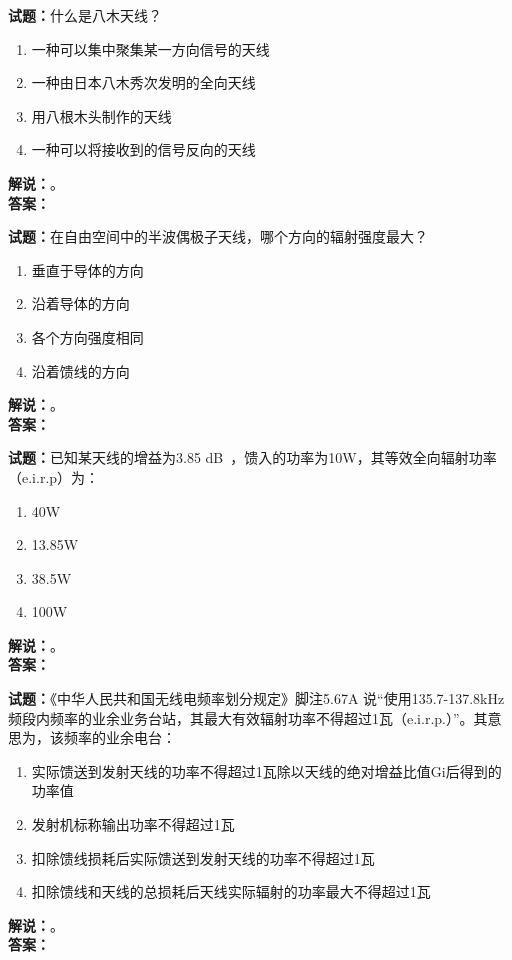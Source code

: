 \documentclass{ctexbook}
\begin{document}
\bigskip

\noindent\textbf{试题：}什么是八木天线？
\begin{enumerate}[leftmargin=3em]
  \item 一种可以集中聚集某一方向信号的天线
  \item 一种由日本八木秀次发明的全向天线
  \item 用八根木头制作的天线
  \item 一种可以将接收到的信号反向的天线
\end{enumerate}
\noindent\textbf{解说：}\textbf{}。\\\noindent\textbf{答案：}

\bigskip

\noindent\textbf{试题：}在自由空间中的半波偶极子天线，哪个方向的辐射强度最大？
\begin{enumerate}[leftmargin=3em]
  \item 垂直于导体的方向
  \item 沿着导体的方向
  \item 各个方向强度相同
  \item 沿着馈线的方向
\end{enumerate}
\noindent\textbf{解说：}\textbf{}。\\\noindent\textbf{答案：}

\bigskip

\noindent\textbf{试题：}已知某天线的增益为3.85 \unit[qualifier-mode=combine]{\deci\bel{}}，馈入的功率为10W，其等效全向辐射功率（e.i.r.p）为：
\begin{enumerate}[leftmargin=3em]
  \item 40W
  \item 13.85W
  \item 38.5W
  \item 100W
\end{enumerate}
\noindent\textbf{解说：}\textbf{}。\\\noindent\textbf{答案：}

\bigskip

\noindent\textbf{试题：}《中华人民共和国无线电频率划分规定》脚注5.67A 说“使用135.7-137.8\unit{\kHz}频段内频率的业余业务台站，其最大有效辐射功率不得超过1瓦（e.i.r.p.）”。其意思为，该频率的业余电台：
\begin{enumerate}[leftmargin=3em]
  \item 实际馈送到发射天线的功率不得超过1瓦除以天线的绝对增益比值Gi后得到的功率值
  \item 发射机标称输出功率不得超过1瓦
  \item 扣除馈线损耗后实际馈送到发射天线的功率不得超过1瓦
  \item 扣除馈线和天线的总损耗后天线实际辐射的功率最大不得超过1瓦
\end{enumerate}
\noindent\textbf{解说：}\textbf{}。\\\noindent\textbf{答案：}
\end{document}
